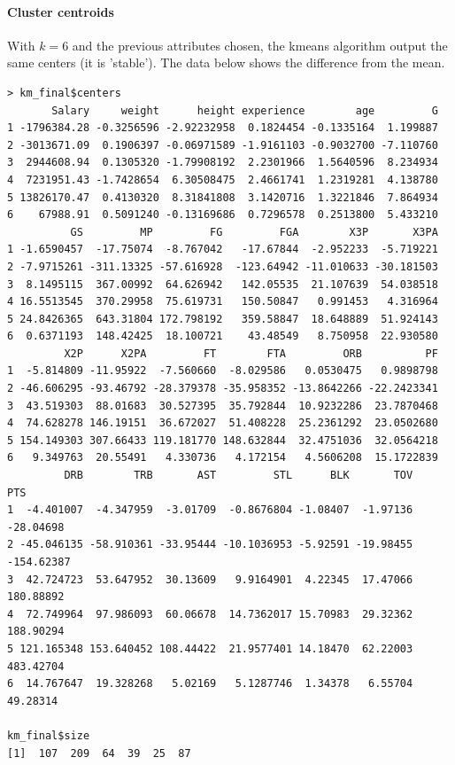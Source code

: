 \paragraph{Cluster centroids}With $k=6$ and the previous attributes chosen, the kmeans algorithm output the same centers (it is 'stable'). The data below shows the difference from the mean.

\begin{verbatim}
> km_final$centers
       Salary     weight      height experience        age         G
1 -1796384.28 -0.3256596 -2.92232958  0.1824454 -0.1335164  1.199887
2 -3013671.09  0.1906397 -0.06971589 -1.9161103 -0.9032700 -7.110760
3  2944608.94  0.1305320 -1.79908192  2.2301966  1.5640596  8.234934  
4  7231951.43 -1.7428654  6.30508475  2.4661741  1.2319281  4.138780 
5 13826170.47  0.4130320  8.31841808  3.1420716  1.3221846  7.864934 
6    67988.91  0.5091240 -0.13169686  0.7296578  0.2513800  5.433210  
          GS         MP         FG         FGA        X3P       X3PA
1 -1.6590457  -17.75074  -8.767042   -17.67844  -2.952233  -5.719221
2 -7.9715261 -311.13325 -57.616928  -123.64942 -11.010633 -30.181503
3  8.1495115  367.00992  64.626942   142.05535  21.107639  54.038518
4 16.5513545  370.29958  75.619731   150.50847   0.991453   4.316964
5 24.8426365  643.31804 172.798192   359.58847  18.648889  51.924143
6  0.6371193  148.42425  18.100721    43.48549   8.750958  22.930580
         X2P      X2PA         FT        FTA         ORB          PF
1  -5.814809 -11.95922  -7.560660  -8.029586   0.0530475   0.9898798
2 -46.606295 -93.46792 -28.379378 -35.958352 -13.8642266 -22.2423341
3  43.519303  88.01683  30.527395  35.792844  10.9232286  23.7870468
4  74.628278 146.19151  36.672027  51.408228  25.2361292  23.0502680
5 154.149303 307.66433 119.181770 148.632844  32.4751036  32.0564218
6   9.349763  20.55491   4.330736   4.172154   4.5606208  15.1722839
         DRB        TRB       AST         STL      BLK       TOV        PTS
1  -4.401007  -4.347959  -3.01709  -0.8676804 -1.08407  -1.97136  -28.04698
2 -45.046135 -58.910361 -33.95444 -10.1036953 -5.92591 -19.98455 -154.62387
3  42.724723  53.647952  30.13609   9.9164901  4.22345  17.47066  180.88892
4  72.749964  97.986093  60.06678  14.7362017 15.70983  29.32362  188.90294
5 121.165348 153.640452 108.44422  21.9577401 14.18470  62.22003  483.42704
6  14.767647  19.328268   5.02169   5.1287746  1.34378   6.55704   49.28314

km_final$size
[1]  107  209  64  39  25  87
\end{verbatim}

